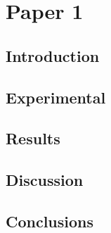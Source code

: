 


\chapter{Paper 1}

\section{Introduction}
\lipsum

\section{Experimental}
\lipsum

\section{Results}
\lipsum

\section{Discussion}
\lipsum

\section{Conclusions}
\lipsum
